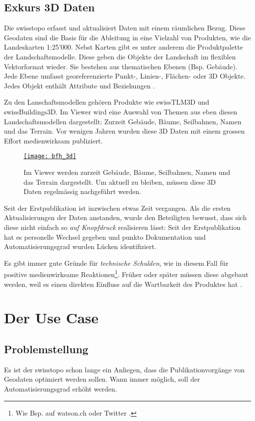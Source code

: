 \newpage

\subsection{Exkurs 3D Daten}
Die swisstopo erfasst und aktualisiert Daten mit einem räumlichen Bezug. Diese Geodaten sind die Basis für die Ableitung in eine Vielzahl von Produkten, wie die Landeskarten 1:25'000. Nebst Karten gibt es unter anderem die Produktpalette der Landschaftsmodelle. Diese geben die Objekte der Landschaft im flexiblen Vektorformat wieder. Sie bestehen aus thematischen Ebenen (Bsp. Gebäude). Jede Ebene umfasst georeferenzierte Punkt-, Linien-, Flächen- oder 3D Objekte. Jedes Objekt enthält Attribute und Beziehungen \cite{toposhop2010}.

Zu den Lanschaftsmodellen gehören Produkte wie swissTLM3D und swissBuildings3D. Im Viewer wird eine Auswahl von Themen aus eben diesen Landschaftsmodellen dargestellt: Zurzeit Gebäude, Bäume, Seilbahnen, Namen und das Terrain. Vor wenigen Jahren wurden diese 3D Daten mit einem grossen Effort medienwirksam publiziert.

\begin{figure}[H]
	\centering
	\href{https://s.geo.admin.ch/8a8ce63073}{
	\texttt{[image: bfh\_3d]}}
	\caption{Im Viewer werden zurzeit Gebäude, Bäume, Seilbahnen, Namen und das Terrain dargestellt. Um aktuell zu bleiben, müssen diese 3D Daten regelmässig nachgeführt werden.}
	\label{fig:bfh_3d}
\end{figure}

Seit der Erstpublikation ist inzwischen etwas Zeit vergangen. Als die ersten Aktualisierungen der Daten anstanden, wurde den Beteiligten bewusst, dass sich diese nicht einfach so \emph{auf Knopfdruck} realisieren lässt: Seit der Erstpublikation hat es personelle Wechsel gegeben und punkto Dokumentation und Automatisierungsgrad wurden Lücken identifiziert.

Es gibt immer gute Gründe für \emph{technische Schulden}, wie in diesem Fall für positive medienwirksame Reaktionen\footnote{Wie Bsp. auf watson.ch oder Twitter \cite{watson2018}.}. Früher oder später müssen diese abgebaut werden, weil es einen direkten Einfluss auf die Wartbarkeit des Produktes hat \cite{technischeschulden2010}.

\section{Der Use Case}
\subsection{Problemstellung}
Es ist der swisstopo schon lange ein Anliegen, dass die Publikationvorgänge von Geodaten optimiert werden
sollen. Wann immer möglich, soll der Automatisierungsgrad erhöht werden.

